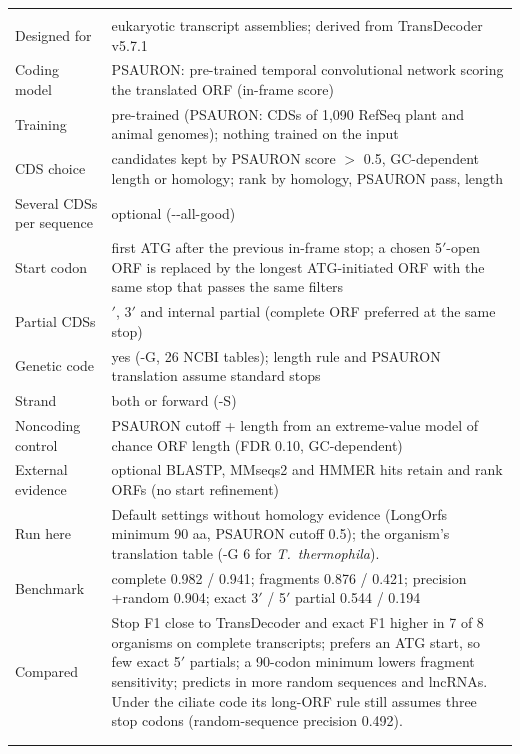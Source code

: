 \begin{longtable}{@{}>{\raggedright}p{3.2cm}>{\raggedright\arraybackslash}p{12.3cm}@{}}
\addlinespace[6pt]
\multicolumn{2}{@{}l}{\textbf{TD2} \citep{Mao2025,Sommer2025} (1.1.0 (PSAURON 1.1.3))} \\*
Designed for & eukaryotic transcript assemblies; derived from TransDecoder v5.7.1 \\*
Coding model & PSAURON: pre-trained temporal convolutional network scoring the translated ORF (in-frame score) \\*
Training & pre-trained (PSAURON: CDSs of 1,090 RefSeq plant and animal genomes); nothing trained on the input \\*
CDS choice & candidates kept by PSAURON score $>$ 0.5, GC-dependent length or homology; rank by homology, PSAURON pass, length \\*
Several CDSs per sequence & optional (-{}-all-good) \\*
Start codon & first ATG after the previous in-frame stop; a chosen 5$'$-open ORF is replaced by the longest ATG-initiated ORF with the same stop that passes the same filters \\*
Partial CDSs & 5$'$, 3$'$ and internal partial (complete ORF preferred at the same stop) \\*
Genetic code & yes (-G, 26 NCBI tables); length rule and PSAURON translation assume standard stops \\*
Strand & both or forward (-S) \\*
Noncoding control & PSAURON cutoff + length from an extreme-value model of chance ORF length (FDR 0.10, GC-dependent) \\*
External evidence & optional BLASTP, MMseqs2 and HMMER hits retain and rank ORFs (no start refinement) \\*
Run here & Default settings without homology evidence (LongOrfs minimum 90 aa, PSAURON cutoff 0.5); the organism's translation table (-G 6 for \textit{T.~thermophila}). \\*
Benchmark & complete 0.982 / 0.941; fragments 0.876 / 0.421; precision +random 0.904; exact 3$'$ / 5$'$ partial 0.544 / 0.194 \\*
Compared & Stop F1 close to TransDecoder and exact F1 higher in 7 of 8 organisms on complete transcripts; prefers an ATG start, so few exact 5$'$ partials; a 90-codon minimum lowers fragment sensitivity; predicts in more random sequences and lncRNAs. Under the ciliate code its long-ORF rule still assumes three stop codons (random-sequence precision 0.492). \\
\addlinespace[6pt]
\multicolumn{2}{@{}l}{\textbf{Prodigal} \citep{Hyatt2010} (2.6.3)} \\*

\end{longtable}
